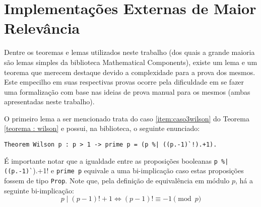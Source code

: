 
\section{Implementações Externas de Maior Relevância}
\label{sec:implementacoes}

Dentre os teoremas e lemas utilizados neste trabalho (dos quais a grande maioria são lemas simples da biblioteca Mathematical Components), existe um lema e um teorema que merecem destaque devido a complexidade para a prova dos mesmos. Este empecilho em suas respectivas provas ocorre pela dificuldade em se fazer uma formalização com base nas ideias de prova manual para os mesmos (ambas apresentadas neste trabalho).

O primeiro lema a ser mencionado trata do caso \ref{item:caso3wilson} do Teorema \ref{teorema : wilson} e possui, na biblioteca, o seguinte enunciado:
        \begin{lstlisting}[language=coq,frame=single,tabsize=1]
Theorem Wilson p : p > 1 -> prime p = (p %| ((p.-1)`!).+1).
        \end{lstlisting}
É importante notar que a igualdade entre as proposições booleanas \lstinline[language=coq]!p %| ((p.-1)`!).+1! e \lstinline[language=coq]!prime p! equivale a uma bi-implicação caso estas proposições fossem de tipo \lstinline[language=coq]|Prop|. Note que, pela definição de equivalência em módulo $p$, há a seguinte bi-implicação:
        \begin{equation}
                p \mid (p-1)! + 1 \Longleftrightarrow (p-1)! \equiv -1 \pmod{p} 
        \end{equation}

